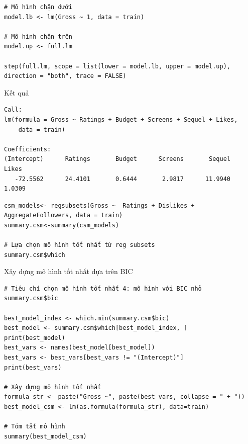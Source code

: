 \begin{lstlisting}
# Mô hình chặn dưới
model.lb <- lm(Gross ~ 1, data = train) 

# Mô hình chặn trên
model.up <- full.lm

step(full.lm, scope = list(lower = model.lb, upper = model.up), direction = "both", trace = FALSE)
\end{lstlisting}

Kết quả
\begin{lstlisting}
Call:
lm(formula = Gross ~ Ratings + Budget + Screens + Sequel + Likes, 
    data = train)

Coefficients:
(Intercept)      Ratings       Budget      Screens       Sequel        Likes  
   -72.5562      24.4101       0.6444       2.9817      11.9940       1.0309  
\end{lstlisting}

\begin{lstlisting}
csm_models<- regsubsets(Gross ~  Ratings + Dislikes + AggregateFollowers, data = train)
summary.csm<-summary(csm_models)

# Lựa chọn mô hình tốt nhất từ reg subsets 
summary.csm$which
\end{lstlisting}


Xây dựng mô hình tốt nhất dựa trên BIC

\begin{lstlisting}
# Tiêu chí chọn mô hình tốt nhất 4: mô hình với BIC nhỏ
summary.csm$bic

best_model_index <- which.min(summary.csm$bic)
best_model <- summary.csm$which[best_model_index, ]
print(best_model)
best_vars <- names(best_model[best_model])
best_vars <- best_vars[best_vars != "(Intercept)"]
print(best_vars)

# Xây dựng mô hình tốt nhất
formula_str <- paste("Gross ~", paste(best_vars, collapse = " + "))
best_model_csm <- lm(as.formula(formula_str), data=train)

# Tóm tắt mô hình
summary(best_model_csm)
\end{lstlisting}

